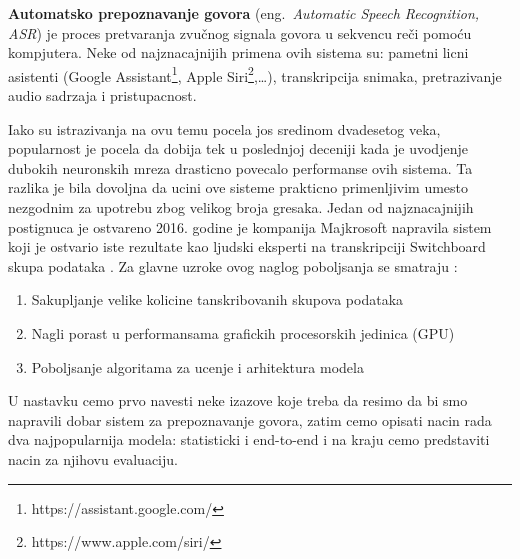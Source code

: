 \documentclass[a4paper]{article}
\begin{document}
\textbf{Automatsko prepoznavanje govora} (eng.~{\em Automatic Speech Recognition, ASR}) je proces pretvaranja zvučnog signala govora u sekvencu reči pomoću kompjutera.
Neke od najznacajnijih primena ovih sistema su: pametni licni asistenti (Google Assistant\footnote{https://assistant.google.com/}, Apple Siri\footnote{https://www.apple.com/siri/},\dots), transkripcija snimaka, pretrazivanje audio sadrzaja i pristupacnost.

Iako su istrazivanja na ovu temu pocela jos sredinom dvadesetog veka, popularnost je pocela da dobija tek u poslednjoj deceniji kada je uvodjenje dubokih neuronskih mreza drasticno povecalo performanse ovih sistema.
Ta razlika je bila dovoljna da ucini ove sisteme prakticno primenljivim umesto nezgodnim za upotrebu zbog velikog broja gresaka.
Jedan od najznacajnijih postignuca je ostvareno 2016. godine je kompanija Majkrosoft napravila sistem koji je ostvario iste rezultate kao ljudski eksperti na transkripciji Switchboard skupa podataka \cite{switchboard}.
Za glavne uzroke ovog naglog poboljsanja se smatraju \cite{hannun2021history}:
\begin{enumerate}
  \item Sakupljanje velike kolicine tanskribovanih skupova podataka
  \item Nagli porast u performansama grafickih procesorskih jedinica (GPU)
  \item Poboljsanje algoritama za ucenje i arhitektura modela
\end{enumerate}

U nastavku cemo prvo navesti neke izazove koje treba da resimo da bi smo napravili dobar sistem za prepoznavanje govora, zatim cemo opisati nacin rada dva najpopularnija modela: statisticki i end-to-end i na kraju cemo predstaviti nacin za njihovu evaluaciju.
\end{document}
